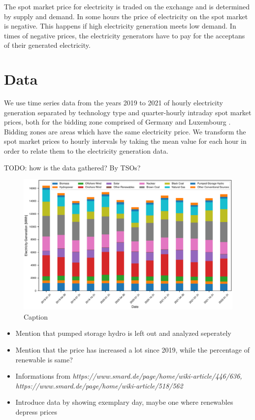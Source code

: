 \documentclass{article}
\begin{document}
The spot market price for electricity is traded on the exchange and is determined by supply and demand. In some hours the price of electricity on the spot market is negative. This happens if high electricity generation meets low demand. In times of negative prices, the electricity generators have to pay for the acceptans of their generated electricity. 

\section{Data}
We use time series data from the years 2019 to 2021 of hourly electricity generation separated by technology type and quarter-hourly intraday spot market prices, both for the bidding zone comprised of Germany and Luxembourg \citep{smard}.
Bidding zones are areas which have the same electricity price.
We transform the spot market prices to hourly intervals by taking the mean value for each hour in order to relate them to the electricity generation data.

TODO: how is the data gathered? By TSOs?

\begin{figure}[h]
    \centering
    \includegraphics[width=0.8\columnwidth]{doc/fig/quarterly_technology_mix.pdf}
    \caption{Caption}
    \label{fig:quarterly_mix}
\end{figure}

\begin{itemize}
    \item Mention that pumped storage hydro is left out and analyzed seperately
    \item Mention that the price has increased a lot since 2019, while the percentage of renewable is same?
    \\
    \item Informations from \textit{https://www.smard.de/page/home/wiki-article/446/636, https://www.smard.de/page/home/wiki-article/518/562}
    \item Introduce data by showing exemplary day, maybe one where renewables depress prices
\end{itemize}
\end{document}
